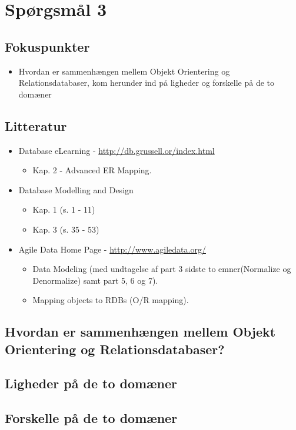 \section{Spørgsmål 3}

\subsection{Fokuspunkter}
\begin{itemize}
	\item Hvordan er sammenhængen mellem Objekt Orientering og Relationsdatabaser, kom herunder ind på ligheder og forskelle på de to domæner
\end{itemize}

\subsection{Litteratur}
\begin{itemize}
	\item Database eLearning - \url{http://db.grussell.or/index.html}
	\begin{itemize}
		\item Kap. 2 - Advanced ER Mapping.
	\end{itemize}
	\item Database Modelling and Design
	\begin{itemize}
		\item Kap. 1 (s. 1 - 11)
		\item Kap. 3 (s. 35 - 53)
	\end{itemize}
	\item Agile Data Home Page - \url{http://www.agiledata.org/}
	\begin{itemize}
		\item Data Modeling (med undtagelse af part 3 sidste to emner(Normalize og Denormalize) samt part 5, 6 og 7).
		\item Mapping objects to RDBs (O/R mapping).
	\end{itemize}
\end{itemize}

\newpage

\subsection{Hvordan er sammenhængen mellem Objekt Orientering og Relationsdatabaser?}


\subsection{Ligheder på de to domæner}

\subsection{Forskelle på de to domæner}
